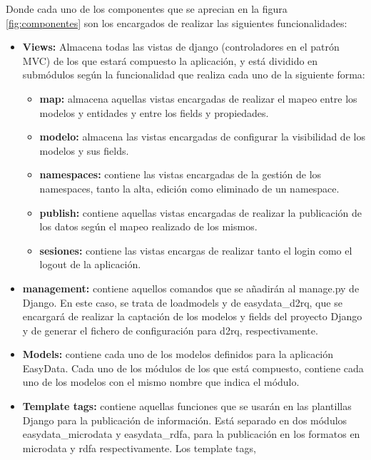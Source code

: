 Donde cada uno de los componentes que se aprecian en la figura
\ref{fig:componentes} son los encargados de realizar las siguientes
funcionalidades:
\begin{itemize}
    \item \textbf{Views:} Almacena todas las vistas de django
        (controladores en el patrón MVC) de los que estará compuesto la
        aplicación, y está dividido en submódulos según la funcionalidad que
        realiza cada uno de la siguiente forma:
    \begin{itemize}
        \item \textbf{map:} almacena aquellas vistas encargadas de realizar el
            mapeo entre los modelos y entidades y entre los fields y
            propiedades.
        \item \textbf{modelo:} almacena las vistas encargadas de configurar la
            visibilidad de los modelos y sus fields.
        \item \textbf{namespaces:} contiene las vistas encargadas de la gestión
            de los namespaces, tanto la alta, edición como eliminado de un
            namespace.
        \item \textbf{publish:} contiene aquellas vistas encargadas de realizar
            la publicación de los datos según el mapeo realizado de los mismos.
        \item \textbf{sesiones:} contiene las vistas encargas de realizar tanto
            el login como el logout de la aplicación.
    \end{itemize}
    \item \textbf{management:} contiene aquellos comandos que se añadirán al
        manage.py de Django. En este caso, se trata de loadmodels y de
        easydata\_d2rq, que se encargará de realizar la captación de los modelos
        y fields del proyecto Django y de generar el fichero de configuración
        para d2rq, respectivamente.
    \item \textbf{Models:} contiene cada uno de los modelos definidos para la
        aplicación EasyData. Cada uno de los módulos de los que está compuesto,
        contiene cada uno de los modelos con el mismo nombre que indica el
        módulo.
    \item \textbf{Template tags:} contiene aquellas funciones que se usarán en
        las plantillas Django para la publicación de información. Está separado
        en dos módulos easydata\_microdata y easydata\_rdfa, para la publicación
        en los formatos en microdata y rdfa respectivamente. Los template tags,

\end{itemize}
